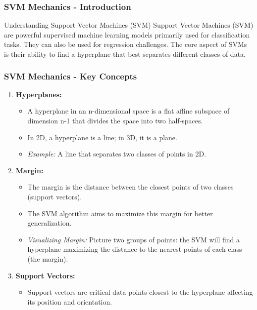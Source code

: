 \documentclass[aspectratio=169]{beamer}
\begin{document}
\begin{frame}[fragile]
  \frametitle{SVM Mechanics - Introduction}
  \begin{block}{Understanding Support Vector Machines (SVM)}
    Support Vector Machines (SVM) are powerful supervised machine learning models primarily used for classification tasks. They can also be used for regression challenges. The core aspect of SVMs is their ability to find a hyperplane that best separates different classes of data.
  \end{block}
\end{frame}

\begin{frame}[fragile]
  \frametitle{SVM Mechanics - Key Concepts}
  \begin{enumerate}
    \item \textbf{Hyperplanes:}
      \begin{itemize}
        \item A hyperplane in an n-dimensional space is a flat affine subspace of dimension n-1 that divides the space into two half-spaces.
        \item In 2D, a hyperplane is a line; in 3D, it is a plane.
        \item \textit{Example:} A line that separates two classes of points in 2D.
      \end{itemize}
    
    \item \textbf{Margin:}
      \begin{itemize}
        \item The margin is the distance between the closest points of two classes (support vectors).
        \item The SVM algorithm aims to maximize this margin for better generalization.
        \item \textit{Visualizing Margin:} Picture two groups of points: the SVM will find a hyperplane maximizing the distance to the nearest points of each class (the margin).
      \end{itemize}
    
    \item \textbf{Support Vectors:}
      \begin{itemize}
        \item Support vectors are critical data points closest to the hyperplane affecting its position and orientation.
      \end{itemize}
  \end{enumerate}
\end{frame}
\end{document}

